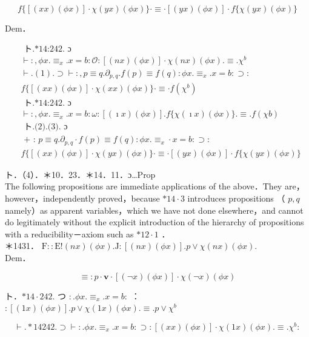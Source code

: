 \documentclass[10pt]{article}
\begin{document}
$$
f\{[(x x)(\phi x)] \cdot \chi(y x)(\phi x)\} \cdot \equiv \cdot[(y x)(\phi x)] \cdot f\{\chi(y x)(\phi x)\}
$$

Dem．


\begin{align*}
& \text { ト.*14:242. ɔ } \\
& \vdash:, \phi x . \equiv_{x} . x=b: \mathcal{O}:[(n x)(\phi x)] \cdot \chi(n x)(\phi x) . \equiv . \chi^{b}  \tag{1}\\
& \vdash .(1) . \supset \vdash:, p \equiv q . \partial_{p, q} . f(p) \equiv f(q): \phi x . \equiv_{x} . x=b: \supset: \\
& f\{[(x x)(\phi x)] \cdot \chi(x x)(\phi x)\} \cdot \equiv \cdot f\left(\chi^{b}\right)  \tag{2}\\
& \text { ト.*14:242. ɔ } \\
& \vdash:, \phi x . \equiv_{x} . x=b: \omega:[(\imath x)(\phi x)] . f\{\chi(\imath x)(\phi x)\} . \equiv . f(\chi b)  \tag{3}\\
& \text { ト.(2).(3). ɔ } \\
& \text { + : } p \equiv q . \partial_{p, q} \cdot f(p) \equiv f(q): \phi x . \equiv_{x} \cdot x=b: \supset: \\
& f\{[(x x)(\phi x)] \cdot \chi(y x)(\phi x)\} \cdot \equiv \cdot[(y x)(\phi x)] \cdot f\{\chi(y x)(\phi x)\} \tag{4}
\end{align*}


ト．（4）．＊10．23．＊14．11．ɔ…Prop\\
The following propositions are immediate applications of the above．They are，however，independently proved，because $* 14 \cdot 3$ introduces propositions （ $p, q$ namely）as apparent variables，which we have not done elsewhere，and cannot do legitimately without the explicit introduction of the hierarchy of propositions with a reducibility－axiom such as $* 12 \cdot 1$ ．\\
＊1431． $\mathrm{F}:: \mathrm{E}!(n x)(\phi x) . \mathrm{J}:[(n x)(\phi x)] . p \vee \chi(n x)(\phi x)$.\\
Dem．

$$
\equiv: p \cdot \mathbf{v} \cdot[(\neg x)(\phi x)] \cdot \chi(\neg x)(\phi x)
$$

ト．$* 14 \cdot 242$. つ $: . \phi x . \equiv_{x} . x=b:$ ：$:[(1 x)(\phi x)] . p \vee \chi(1 x)(\phi x) . \equiv . p \vee \chi^{b}$


\begin{equation*}
\vdash . * 14242 . \supset \vdash: . \phi x . \equiv_{x} . x=b: \supset:[(x x)(\phi x)] \cdot \chi(1 x)(\phi x) . \equiv . \chi^{b}: \tag{1}
\end{equation*}
\end{document}
